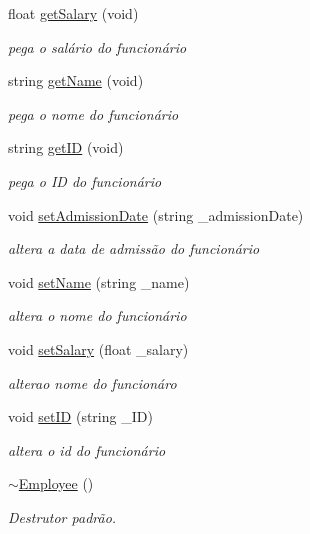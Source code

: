 \begin{DoxyCompactItemize}
float \hyperlink{classEmployee_a5d4eef7887d1e7746858f324869c8452}{get\+Salary} (void)
\begin{DoxyCompactList}\small\item\em pega o salário do funcionário \end{DoxyCompactList}\item 
string \hyperlink{classEmployee_a6d9a4c9774bf7953142f07ab13f4e297}{get\+Name} (void)
\begin{DoxyCompactList}\small\item\em pega o nome do funcionário \end{DoxyCompactList}\item 
string \hyperlink{classEmployee_a7b06dc8ef948b2b57f742b0f5d481c50}{get\+ID} (void)
\begin{DoxyCompactList}\small\item\em pega o ID do funcionário \end{DoxyCompactList}\item 
void \hyperlink{classEmployee_ae513cdd4bf5b02cc20164fdfd18afe26}{set\+Admission\+Date} (string \+\_\+admission\+Date)
\begin{DoxyCompactList}\small\item\em altera a data de admissão do funcionário \end{DoxyCompactList}\item 
void \hyperlink{classEmployee_a835df66ad4a23a0bd537f1a4baaf8565}{set\+Name} (string \+\_\+name)
\begin{DoxyCompactList}\small\item\em altera o nome do funcionário \end{DoxyCompactList}\item 
void \hyperlink{classEmployee_a7fb79240f7b8ac4321d79a858d079101}{set\+Salary} (float \+\_\+salary)
\begin{DoxyCompactList}\small\item\em alterao nome do funcionáro \end{DoxyCompactList}\item 
void \hyperlink{classEmployee_a9e0e5ac20c4179ac1926b59fb34f3933}{set\+ID} (string \+\_\+\+ID)
\begin{DoxyCompactList}\small\item\em altera o id do funcionário \end{DoxyCompactList}\item 
\hyperlink{classEmployee_abed56e9c007fff2bfe27ca87251baaf2}{$\sim$\+Employee} ()
\begin{DoxyCompactList}\small\item\em Destrutor padrão. \end{DoxyCompactList}\end{DoxyCompactItemize}


